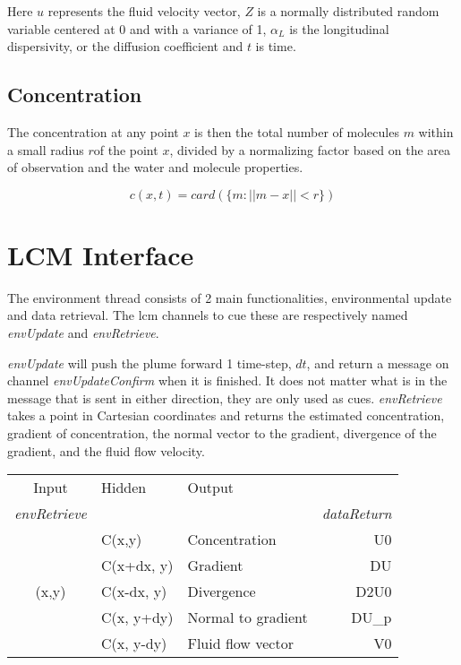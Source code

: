 \documentclass[11pt]{article} %
\begin{document}
Here $u$ represents the fluid velocity vector,  $Z$ is a normally distributed random variable centered at 0 and with a variance of 1, $\alpha_L$ is the longitudinal dispersivity, or the diffusion coefficient and $t$ is time.  

\subsection{Concentration}

The concentration at any point $x$ is then the total number of molecules $m$ within a small radius $r$of the point $x$, divided by a normalizing factor based on the area of observation and the water and molecule properties.  

$$
c(x,t) = card( \{  m : ||m-x|| < r \} )
$$



\section{LCM Interface}
The environment thread consists of 2 main functionalities, environmental update and data retrieval. The lcm channels to cue these are respectively named {\it envUpdate} and {\it envRetrieve}.

{\it envUpdate} will push the plume forward 1 time-step, $dt$, and return a message on channel {\it envUpdateConfirm} when it is finished.  It does not matter what is in the message that is sent in either direction, they are only used as cues. {\it envRetrieve} takes a point in Cartesian coordinates and returns the estimated concentration, gradient of concentration, the normal vector to the gradient, divergence of the gradient, and the fluid flow velocity. \\

\begin{tabular}{ c| l| l |r}
  Input& Hidden & Output&  \\

{\it envRetrieve}&&&{\it dataReturn} \\\hline
                     & C(x,y)         & Concentration  & U0 \\
                     & C(x+dx, y) & Gradient & DU\\
     (x,y)        & C(x-dx, y) &Divergence  & D2U0  \\
                     & C(x, y+dy) & Normal to gradient & DU\_p\\
                     & C(x, y-dy) & Fluid flow vector & V0 \\
\end{tabular}\\
\end{document}
